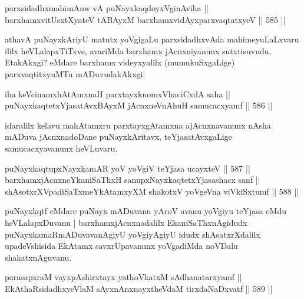 \begin{shl}
parxsidadhxmahimAnw vA puNayxkaqdoyxVginAviha || \\
barxhamxvitUsxtXyateV tABAyxM barxhamxvidAyxparxvaqtatxyeV \hfill || 585 ||  
\end{shl}

\begin{artha}
athavA puNayxkAriyU matutx yoVgigaLu parxsidadhxvAda mahimeyuLaLxvaru
ililx heVLalapxTiTxve, avariMda barxhamx jAcnxniyanunx sutxtisuvudu,
EtakAkxgi? eMdare barxhamx videyxyalilx (mumukuSxgaLige)
parxvaqtitxyuMTu mADuvudakAkxgi.
\end{artha}


\begin{shl}
iha keVcinamxhAtAmxnaH parxtayxknomxVhaciCxdA saha || \\
puNayxkaqtetxYjasatAvxBAyxM jAcnxneVnA\s \s huH samucacxyamf \hfill || 586 ||  
\end{shl}

\begin{artha}
idaralilx kelavu mahAtamxru parxtayxgAtamxna ajAcnxnavanunx nAsha
mADuva jAcnxnadoDane puNayxkAritavx, teYjasatAvxgaLige samucacxyavanunx heVLuvaru.
\end{artha}


\begin{shl}
puNayxkaqtupxNayxkamAR yoV yoVgiV teYjasa ucayxteV \hfill || 587 ||  \\
barxhamxjAcnxneYkaniSaThxH sanupxNayxkaqtetxYjasashacx sanf || \\
shAsotxrXVpadiSaTxmeYkAtamxyXM shakotxV yoVgeVna viVkiSxtumf \hfill || 588 ||  
\end{shl}

\begin{artha}
puNayxkqtf eMdare puNayx mADuvanu yAroV avanu yoVgiyu teYjasa eMdu
heVLalapxDuvanu | barxhamxjAcnxnadalilx EkaniSaThxnAgidudx
puNayxkamaRmADuvavanAgiyU yoVgiyAgiyU idudx shAsatxrXdalilx
upadeVshisida EkAtamx savxrUpavanunx yoVgadiMda noVDalu shakatxnAguvanu.
\end{artha}

\begin{shl}
parasapxraM vayxpAshirxtayx yathoVkatxM sAdhanatarxyamf || \\
EkAthaRsidadhxyeV\s laM sAyxnAnxnayxtheVdaM tirxdaNaDxvatf \hfill || 589 ||  
\end{shl}


